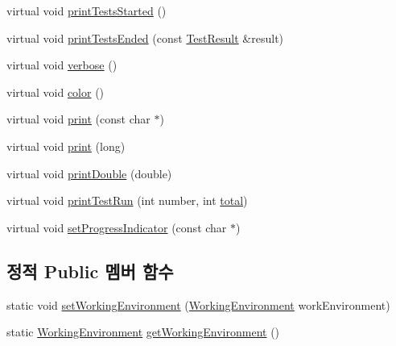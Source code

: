 \begin{DoxyCompactItemize}
virtual void \hyperlink{class_test_output_a1c2b129bfdc2b392ffa618864707dd89}{print\+Tests\+Started} ()
\item 
virtual void \hyperlink{class_test_output_acc5ba82a215510b66f5f294258686dd4}{print\+Tests\+Ended} (const \hyperlink{class_test_result}{Test\+Result} \&result)
\item 
virtual void \hyperlink{class_test_output_a2ae0a8d48809abb33b5ba47c56fdc3ad}{verbose} ()
\item 
virtual void \hyperlink{class_test_output_ae8d23f2d3de1d9d47d8139d54fb89640}{color} ()
\item 
virtual void \hyperlink{class_test_output_a321b5c489a90374cb61c34fe5d2253ef}{print} (const char $\ast$)
\item 
virtual void \hyperlink{class_test_output_afdf7e5004a8aead20ea3b1ddec76fa73}{print} (long)
\item 
virtual void \hyperlink{class_test_output_a0ed13c187762336a2bf0fd89687b014a}{print\+Double} (double)
\item 
virtual void \hyperlink{class_test_output_a0cffc4628d21b0cd25649f9084927ca9}{print\+Test\+Run} (int number, int \hyperlink{test__intervals_8c_ac7af894858cf396a219d632f40afdc8d}{total})
\item 
virtual void \hyperlink{class_test_output_a97c09fc275d40b7ec559aaa91843cdcd}{set\+Progress\+Indicator} (const char $\ast$)
\end{DoxyCompactItemize}
\subsection*{정적 Public 멤버 함수}
\begin{DoxyCompactItemize}
\item 
static void \hyperlink{class_test_output_a25907ddd60d8454ca78f81edef6c77c3}{set\+Working\+Environment} (\hyperlink{class_test_output_a0541851f863713454486a9fb3080f766}{Working\+Environment} work\+Environment)
\item 
static \hyperlink{class_test_output_a0541851f863713454486a9fb3080f766}{Working\+Environment} \hyperlink{class_test_output_a90d5028d0f7f6f41ca2dced042a8709d}{get\+Working\+Environment} ()
\end{DoxyCompactItemize}
